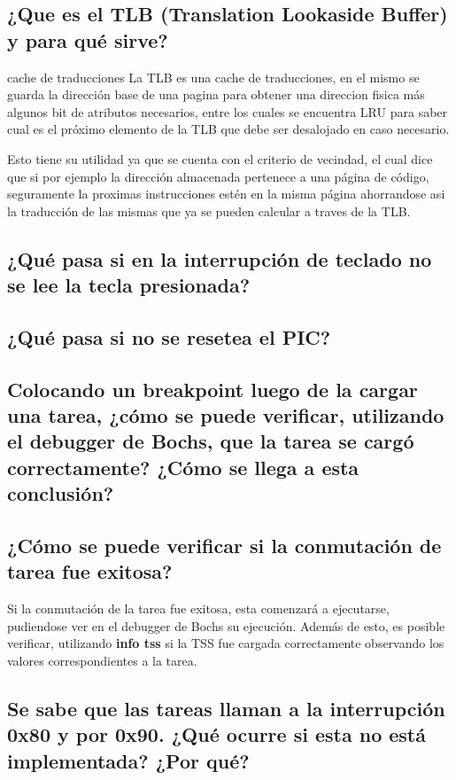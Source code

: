 \documentclass[a4paper,10pt,twoside]{article}
\begin{document}
\subsection{¿Que es el TLB (Translation Lookaside Buffer) y para qué sirve?}cache de traducciones
La TLB es una cache de traducciones, en el mismo se guarda la dirección base de una pagina para obtener una direccion fisica más algunos bit de atributos necesarios, entre los cuales se encuentra LRU para saber cual es el próximo elemento de la TLB que debe ser desalojado en caso necesario.

Esto tiene su utilidad ya que se cuenta con el criterio de vecindad, el cual dice que si por ejemplo la dirección almacenada pertenece a una página de código, seguramente la proximas instrucciones estén en la misma página ahorrandose asi la traducción de las mismas que ya se pueden calcular a traves de la TLB. 

\subsection{¿Qué pasa si en la interrupción de teclado no se lee la tecla presionada?}

\subsection{¿Qué pasa si no se resetea el PIC?}

\subsection{Colocando un breakpoint luego de la cargar una tarea, ¿cómo se puede
verificar, utilizando el debugger de Bochs, que la tarea se cargó correctamente? ¿Cómo se
llega a esta conclusión?}

\subsection{¿Cómo se puede verificar si la conmutación de tarea fue exitosa?}
Si la conmutación de la tarea fue exitosa, esta comenzará a ejecutarse, pudiendose ver en el debugger de Bochs su ejecución. Además de esto, es posible verificar, utilizando \textbf{info tss} si la TSS fue cargada correctamente observando los valores correspondientes a la tarea.

\subsection{Se sabe que las tareas llaman a la interrupción 0x80 y por 0x90. ¿Qué ocurre si esta no está implementada? ¿Por qué?}
\end{document}
